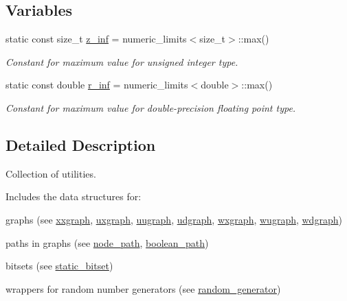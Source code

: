 \subsection*{Variables}
\begin{DoxyCompactItemize}
\item 
static const size\+\_\+t \hyperlink{namespacelgraph_1_1utils_a3db646ea6b211c71a055e53066513ebb}{z\+\_\+inf} = numeric\+\_\+limits$<$size\+\_\+t$>$\+::max()\hypertarget{namespacelgraph_1_1utils_a3db646ea6b211c71a055e53066513ebb}{}\label{namespacelgraph_1_1utils_a3db646ea6b211c71a055e53066513ebb}

\begin{DoxyCompactList}\small\item\em Constant for maximum value for unsigned integer type. \end{DoxyCompactList}\item 
static const double \hyperlink{namespacelgraph_1_1utils_aff1de7a502334a782aa94275b61cf307}{r\+\_\+inf} = numeric\+\_\+limits$<$double$>$\+::max()\hypertarget{namespacelgraph_1_1utils_aff1de7a502334a782aa94275b61cf307}{}\label{namespacelgraph_1_1utils_aff1de7a502334a782aa94275b61cf307}

\begin{DoxyCompactList}\small\item\em Constant for maximum value for double-\/precision floating point type. \end{DoxyCompactList}\end{DoxyCompactItemize}


\subsection{Detailed Description}
Collection of utilities. 

Includes the data structures for\+:
\begin{DoxyItemize}
\item graphs (see \hyperlink{classlgraph_1_1utils_1_1xxgraph}{xxgraph}, \hyperlink{classlgraph_1_1utils_1_1uxgraph}{uxgraph}, \hyperlink{classlgraph_1_1utils_1_1uugraph}{uugraph}, \hyperlink{classlgraph_1_1utils_1_1udgraph}{udgraph}, \hyperlink{classlgraph_1_1utils_1_1wxgraph}{wxgraph}, \hyperlink{classlgraph_1_1utils_1_1wugraph}{wugraph}, \hyperlink{classlgraph_1_1utils_1_1wdgraph}{wdgraph})
\item paths in graphs (see \hyperlink{classlgraph_1_1utils_1_1node__path}{node\+\_\+path}, \hyperlink{classlgraph_1_1utils_1_1boolean__path}{boolean\+\_\+path})
\item bitsets (see \hyperlink{classlgraph_1_1utils_1_1static__bitset}{static\+\_\+bitset})
\item wrappers for random number generators (see \hyperlink{classlgraph_1_1utils_1_1random__generator}{random\+\_\+generator})
\end{DoxyItemize}

